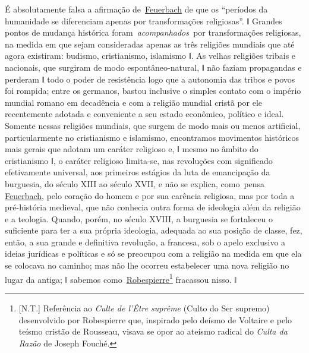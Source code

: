É absolutamente falsa a afirmação
de~\href{https://www.marxists.org/portugues/dicionario/verbetes/f/feuerbach.htm}{Feuerbach}
de que os ``períodos da humanidade se diferenciam apenas por
transformações religiosas''. ǁ Grandes pontos de mudança histórica
foram~\emph{acompanhados~}por transformações religiosas, na medida em
que sejam consideradas apenas as três religiões mundiais que até agora
existiram: budismo, cristianismo, islamismo ǁ. As velhas religiões
tribais e nacionais, que surgiram de modo espontâneo-natural, ǁ não
faziam propagandas e perderam ǁ todo o poder de resistência logo que a
autonomia das tribos e povos foi rompida; entre os germanos, bastou
inclusive o simples contato com o império mundial romano em decadência e
com a religião mundial cristã por ele recentemente adotada e conveniente
a seu estado econômico, político e ideal. Somente nessas religiões
mundiais, que surgem de modo mais ou menos artificial, particularmente
no cristianismo e islamismo, encontramos movimentos históricos mais
gerais que adotam um caráter religioso e, ǁ mesmo no âmbito do
cristianismo ǁ, o caráter religioso limita-se, nas revoluções com
significado efetivamente universal, aos primeiros estágios da luta de
emancipação da burguesia, do século XIII ao século XVII, e não se
explica, como~pensa
\href{https://www.marxists.org/portugues/dicionario/verbetes/f/feuerbach.htm}{Feuerbach},
pelo coração do homem e por sua carência religiosa, mas por toda a
pré-história medieval, que não conhecia outra forma de ideologia além da
religião e a teologia. Quando, porém, no século XVIII, a burguesia se
fortaleceu o suficiente para ter a sua própria ideologia, adequada ao
sua posição de classe, fez, então, a sua grande e definitiva revolução,
a francesa, sob o apelo exclusivo a ideias jurídicas e políticas e só se
preocupou com a religião na medida em que ela se colocava no caminho;
mas não lhe ocorreu estabelecer uma nova religião no lugar da antiga; ǁ
sabemos
como~\href{https://www.marxists.org/portugues/dicionario/verbetes/r/robespierre_maximilien.htm}{Robespierre}\footnote{{[}N.T.{]}
  Referência ao \emph{Culte de l'Être suprême} (Culto do Ser supremo)
  desenvolvido por Robespierre que, inspirado pelo deísmo de Voltaire e
  pelo teísmo cristão de Rousseau, visava se opor ao ateísmo radical do
  \emph{Culta da Razão} de Joseph Fouché.} fracassou nisso. ǁ


